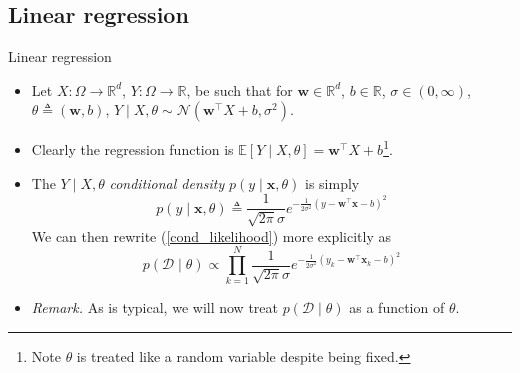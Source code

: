 \documentclass{beamer}
\numberwithin{equation}{section}
\newcommand{\aref}[1]{\alert{\ref{#1}}}
\begin{document}
\subsection{Linear regression}

\begin{frame}{Linear regression}
    \begin{itemize}
        \item
        Let $ X : \Omega \rightarrow \mathbb{R}^d $,
        $ Y : \Omega \rightarrow \mathbb{R} $, be such that for
        $ \mathbf{w} \in \mathbb{R}^d $, $ b \in \mathbb{R} $,
        $ \sigma \in (0, \infty) $, $ \theta \triangleq (\mathbf{w}, b) $,
        $ Y \mid X, \theta \sim \mathcal{N}\left(
        \mathbf{w}^\top X + b, \sigma^2\right) $.

        \item
        Clearly the regression function is $ \mathbb{E}[Y \mid X, \theta] =
        \mathbf{w}^\top X + b $\footnote{
            Note $ \theta $ is treated like a random variable despite being
            fixed.
        }.

        \item
        The $ Y \mid X, \theta $ \textit{conditional density}
        $ p(y \mid \mathbf{x}, \theta) $ is simply
       \begin{equation} \label{linreg_density}
           p(y \mid \mathbf{x}, \theta) \triangleq
	           \frac{1}{\sqrt{2\pi}\sigma}
	           e^{-\frac{1}{2\sigma^2}\left(
	               y - \mathbf{w}^\top\mathbf{x} - b
               \right)^2}
       \end{equation}
       We can then rewrite (\aref{cond_likelihood}) more explicitly as
       \begin{equation} \label{linreg_like}
           p(\mathcal{D} \mid \theta) \propto
               \prod_{k = 1}^N\frac{1}{\sqrt{2\pi}\sigma}
               e^{-\frac{1}{2\sigma^2}\left(
                   y_k - \mathbf{w}^\top\mathbf{x}_k - b
               \right)^2}
       \end{equation}

        \item
        \textit{Remark.} As is typical, we will now treat
        $ p(\mathcal{D} \mid \theta) $ as a function of $ \theta $.
    \end{itemize}
\end{frame}
\end{document}
